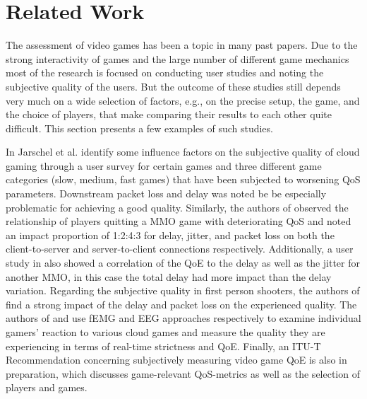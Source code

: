 \section{Related Work}
\label{sec:relatedwork}


The assessment of video games has been a topic in many past papers. Due to the strong interactivity of games and the large number of different game mechanics most of the research is focused on conducting user studies and noting the subjective quality of the users. But the outcome of these studies still depends very much on a wide selection of factors, e.g., on the precise setup, the game, and the choice of players, that make comparing their results to each other quite difficult. This section presents a few examples of such studies.

In \cite{5976180} Jarschel et al. identify some influence factors on the subjective quality of cloud gaming through a user survey for certain games and three different game categories (slow, medium, fast games) that have been subjected to worsening \gls{QoS} parameters. Downstream packet loss and delay was noted be be especially problematic for achieving a good quality. Similarly, the authors of \cite{4591393} observed the relationship of players quitting a \gls{MMO} game with deteriorating \gls{QoS} and noted an impact proportion of 1:2:4:3 for delay, jitter, and packet loss on both the client-to-server and server-to-client connections respectively. Additionally, a user study in \cite{4604397} also showed a correlation of the \gls{QoE} to the delay as well as the jitter for another \gls{MMO}, in this case the total delay had more impact than the delay variation. Regarding the subjective quality in first person shooters, the authors of \cite{6614351} find a strong impact of the delay and packet loss on the experienced quality. The authors of \cite{6404025} and \cite{beyerusing} use \gls{fEMG} and \gls{EEG} approaches respectively to examine individual gamers' reaction to various cloud games and measure the quality they are experiencing in terms of real-time strictness and \gls{QoE}. Finally, an ITU-T Recommendation \cite{mollertowards} concerning subjectively measuring video game \gls{QoE} is also in preparation, which discusses game-relevant \gls{QoS}-metrics as well as the selection of players and games.

